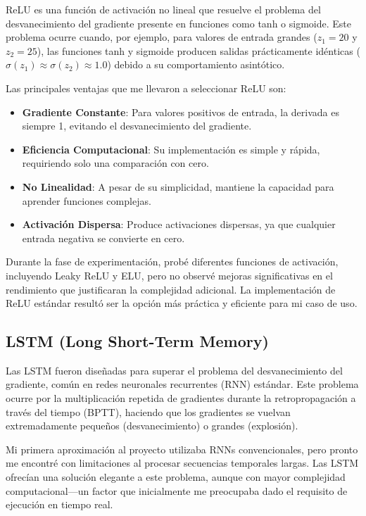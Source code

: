 ReLU es una función de activación no lineal que resuelve el problema del desvanecimiento del gradiente presente en funciones como tanh o sigmoide. Este problema ocurre cuando, por ejemplo, para valores de entrada grandes ($z_1 = 20$ y $z_2 = 25$), las funciones tanh y sigmoide producen salidas prácticamente idénticas ($\sigma(z_1) \approx \sigma(z_2) \approx 1.0$) debido a su comportamiento asintótico.

Las principales ventajas que me llevaron a seleccionar ReLU son:

\begin{itemize}
    \item \textbf{Gradiente Constante}: Para valores positivos de entrada, la derivada es siempre 1, evitando el desvanecimiento del gradiente.
    \item \textbf{Eficiencia Computacional}: Su implementación es simple y rápida, requiriendo solo una comparación con cero.
    \item \textbf{No Linealidad}: A pesar de su simplicidad, mantiene la capacidad para aprender funciones complejas.
    \item \textbf{Activación Dispersa}: Produce activaciones dispersas, ya que cualquier entrada negativa se convierte en cero.
\end{itemize}

Durante la fase de experimentación, probé diferentes funciones de activación, incluyendo Leaky ReLU y ELU, pero no observé mejoras significativas en el rendimiento que justificaran la complejidad adicional. La implementación de ReLU estándar resultó ser la opción más práctica y eficiente para mi caso de uso.

\subsection{LSTM (Long Short-Term Memory)}

Las LSTM fueron diseñadas para superar el problema del desvanecimiento del gradiente, común en redes neuronales recurrentes (RNN) estándar. Este problema ocurre por la multiplicación repetida de gradientes durante la retropropagación a través del tiempo (BPTT), haciendo que los gradientes se vuelvan extremadamente pequeños (desvanecimiento) o grandes (explosión).

Mi primera aproximación al proyecto utilizaba RNNs convencionales, pero pronto me encontré con limitaciones al procesar secuencias temporales largas. Las LSTM ofrecían una solución elegante a este problema, aunque con mayor complejidad computacional—un factor que inicialmente me preocupaba dado el requisito de ejecución en tiempo real.

